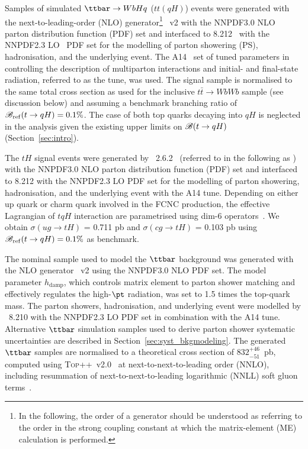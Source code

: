 Samples of simulated $\ttbar \to WbHq$ ($tt(qH)$) events were generated with the next-to-leading-order (NLO) generator\footnote{In the following, 
the order of a generator should be understood as referring to the order in the strong coupling constant at which the matrix-element (ME) calculation 
is performed.} {\powheg}~v2 \cite{Frixione:2007nw,Nason:2004rx,Frixione:2007vw,Alioli:2010xd}
with the NNPDF3.0 NLO~\cite{Ball:2014uwa} parton distribution function (PDF) set and interfaced to {\pythia} 8.212~\cite{Sjostrand:2007gs} with the NNPDF2.3 LO~\cite{Ball:2012cx} PDF set for the modelling of parton showering (PS), hadronisation, and the underlying event. 
The A14~\cite{ATLASUETune4} set of tuned parameters in {\pythia} controlling the description of multiparton interactions and  
initial- and final-state radiation, referred to as the tune, was used.
The signal sample is normalised to the same total cross section as used for the inclusive $t\bar{t}\to WbWb$ sample (see discussion below) and
assuming a benchmark branching ratio of $\mathscr{B}_{\mathrm{ref}}(t\to qH)=0.1\%$.
The case of both top quarks decaying into $qH$ is neglected in the analysis given the existing upper limits on $\mathscr{B}(t \to qH)$ (Section~\ref{sec:intro}).

The $tH$ signal events were generated by {\amcatnlolong}~2.6.2~\cite{Alwall:2014hca}  (referred to in the following as {\amcatnlo})
with the NNPDF3.0 NLO parton distribution function (PDF) set and interfaced to {\pythia} 8.212 with the NNPDF2.3 LO PDF set for the modelling of parton showering,
hadronisation, and the underlying event with the A14 tune.
Depending on either up quark or charm quark involved in the FCNC production, the effective Lagrangian of $tqH$ interaction are parametrised using
dim-6 operators~\cite{fcnc_production_theory}. We obtain $\sigma(ug\to tH)$ = 0.711 pb and $\sigma(cg\to tH)$ = 0.103 pb using $\mathscr{B}_{\mathrm{ref}}(t\to qH)=0.1\%$ as benchmark.   

The nominal sample used to model the $\ttbar$ background was generated with the NLO generator {\powheg}~v2
using the NNPDF3.0 NLO PDF set. The {\powheg} model parameter $h_{\textrm{damp}}$, which controls 
matrix element to parton shower matching and effectively regulates the high-$\pt$ radiation, was set to 1.5 times the top-quark mass. 
The parton showers, hadronisation, and underlying event were modelled by {\pythia}~8.210 with the NNPDF2.3 LO PDF set in combination with the A14 tune.
Alternative $\ttbar$ simulation samples used to derive parton shower systematic uncertainties are described in Section~\ref{sec:syst_bkgmodeling}. 
The generated $\ttbar$ samples are normalised to a theoretical cross section of $832^{+46}_{-51}$~pb, 
computed using \textsc{Top++}~v2.0~\cite{Czakon:2011xx} at next-to-next-to-leading order (NNLO), 
including resummation of next-to-next-to-leading logarithmic (NNLL) soft gluon 
terms~\cite{Cacciari:2011hy,Baernreuther:2012ws,Czakon:2012zr,Czakon:2012pz,Czakon:2013goa}.

